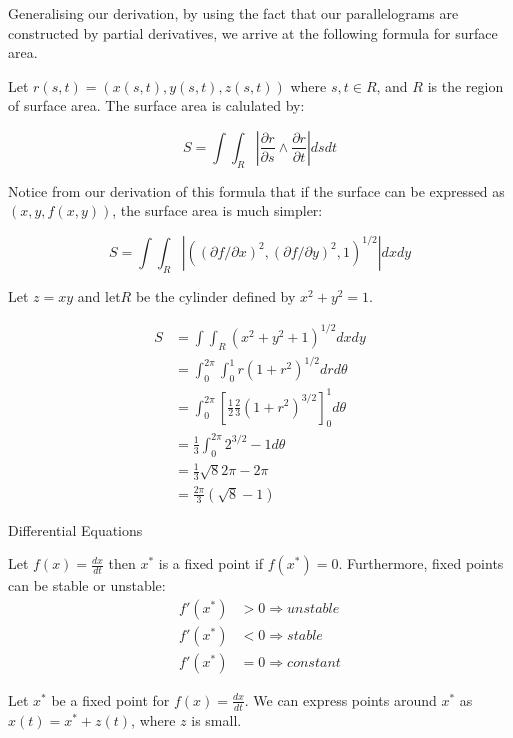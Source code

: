 \documentclass[a4paper,10pt]{article}
\begin{document}
Generalising our derivation, by using the fact that our parallelograms
are constructed by partial derivatives, we arrive at the following
formula for surface area.

Let $r(s,t) = (x(s,t), y(s,t), z(s,t))$ where $s,t \in R$, and $R$ is the
region of surface area. The surface area is calulated by:

\[
	S = \int \int_R \left| \frac{\partial r}{\partial s} \wedge
	\frac{\partial r}{\partial t} \right| dsdt
\]

Notice from our derivation of this formula that if the surface can be
expressed as $(x,y,f(x,y))$, the surface area is much simpler:

\[
	S = \int \int_R \left|
	\left(
		(\partial f / \partial x)^2,
		(\partial f / \partial y)^2,
		1
	\right)^{1/2}
	\right|
	dxdy
\]

\begin{ex}
	Let $z=xy$ and let$R$ be the cylinder defined by $x^2 + y^2 = 1$.

	\begin{align*}
		S &= \int \int_R \left( x^2 + y^2 + 1 \right)^{1/2} dxdy \\
		&= \int_0^{2\pi} \int_0^1 r(1+r^2)^{1/2} drd\theta \\
		&= \int_0^{2\pi}
		\left[
			\frac{1}{2} \frac{2}{3} (1+r^2)^{3/2}
		\right]_0^1 d\theta \\
		&= \frac{1}{3} \int_0^{2\pi} 2^{3/2} - 1 d\theta \\
		&= \frac{1}{3} \sqrt{8} 2\pi - 2\pi \\
		&= \frac{2\pi}{3} (\sqrt{8} - 1)
	\end{align*}
\end{ex}

Differential Equations

\begin{defn}
	Let $f(x) = \frac{dx}{dt}$ then $x^*$ is a fixed point if $f(x^*) = 0$.
	Furthermore, fixed points can be stable or unstable:
	\begin{align*}
		f'(x^*) &> 0 \Rightarrow unstable \\
		f'(x^*) &< 0 \Rightarrow stable \\
		f'(x^*) &= 0 \Rightarrow constant
	\end{align*}
\end{defn}

Let $x^*$ be a fixed point for $f(x) = \frac{dx}{dt}$. We can express
points around $x^*$ as $x(t) = x^* + z(t)$, where $z$ is small.
\end{document}
